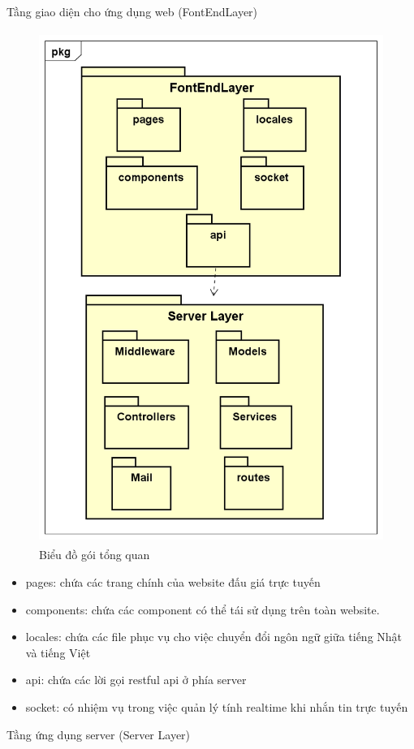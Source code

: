 \documentclass[../DoAn.tex]{subfiles}
\begin{document}
Tầng giao diện cho ứng dụng web (FontEndLayer)
\begin{figure}[H]
    \centering
    \includegraphics[width=11.4cm,height=16.7cm]{Hinhve/thiet_ke_tong_quan.png}
    \caption{Biểu đồ gói tổng quan}
    \label{fig:Fig43}
\end{figure}
\begin{itemize}
    \item pages: chứa các trang chính của website đấu giá trực tuyến
    \item components: chứa các component có thể tái sử dụng trên toàn website.
    \item locales: chứa các file phục vụ cho việc chuyển đổi ngôn ngữ giữa tiếng Nhật và tiếng Việt
    \item api: chứa các lời gọi restful api ở phía server
    \item socket: có nhiệm vụ trong việc quản lý tính realtime khi nhắn tin trực tuyến
\end{itemize}
Tầng ứng dụng server (Server Layer)
\end{document}
